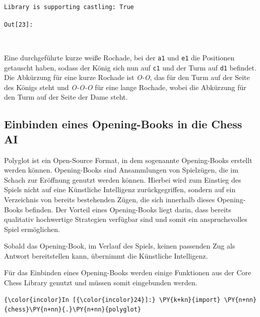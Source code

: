     \begin{Verbatim}[commandchars=\\\{\}]
Library is supporting castling: True

    \end{Verbatim}
\texttt{\color{outcolor}Out[{\color{outcolor}23}]:}
    
    \begin{center}
    \end{center}
    { \hspace*{\fill} \\}
    

    Eine durchgeführte kurze weiße Rochade, bei der \texttt{a1} und
\texttt{e1} die Positionen getauscht haben, sodass der König sich nun
auf \texttt{c1} und der Turm auf \texttt{d1} befindet. Die Abkürzung für
eine kurze Rochade ist \emph{O-O}, das für den Turm auf der Seite des
Königs steht und \emph{O-O-O} für eine lange Rochade, wobei die
Abkürzung für den Turm auf der Seite der Dame steht.

    \subsection{Einbinden eines Opening-Books in die Chess
AI}\label{einbinden-eines-opening-books-in-die-chess-ai}

Polyglot ist ein Open-Source Format, in dem sogenannte Opening-Books
erstellt werden können. Opening-Books sind Ansammlungen von Spielzügen,
die im Schach zur Eröffnung genutzt werden können. Hierbei wird zum
Einstieg des Spiels nicht auf eine Künstliche Intelligenz
zurückgegriffen, sondern auf ein Verzeichnis von bereits bestehenden
Zügen, die sich innerhalb dieses Opening-Books befinden. Der Vorteil
eines Opening-Books liegt darin, dass bereits qualitativ hochwertige
Strategien verfügbar sind und somit ein anspruchsvolles Spiel
ermöglichen.

Sobald das Opening-Book, im Verlauf des Spiels, keinen passenden Zug als
Antwort bereitstellen kann, übernimmt die Künstliche Intelligenz.

Für das Einbinden eines Opening-Books werden einige Funktionen aus der
Core Chess Library genutzt und müssen somit eingebunden werden.

    \begin{Verbatim}[commandchars=\\\{\}]
{\color{incolor}In [{\color{incolor}24}]:} \PY{k+kn}{import} \PY{n+nn}{chess}\PY{n+nn}{.}\PY{n+nn}{polyglot}
\end{Verbatim}


